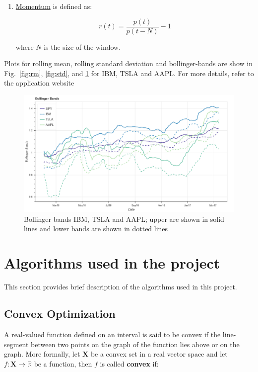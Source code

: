 \documentclass[12pt]{article}
\begin{document}
\begin{itemize}
\begin{enumerate}
\item \underline{Momentum} is defined as:

\begin{equation}
 \label{eq:mtm}
r(t)=\frac{p(t)}{p(t-N)}-1
\end{equation}

where $N$ is the size of the window.
\end{enumerate}

Plots for rolling mean, rolling standard deviation and bollinger-bands are show in  Fig.~\ref{fig:rm}, \ref{fig:std}, and \ref{fig:bb} for IBM, TSLA and AAPL. For more details, refer to the application website \cite{pp}

\begin{figure}[!htbp]
\begin{center}
\includegraphics[height=0.5\textheight,width=\textwidth]{rolling_bb.png}
\caption{Bollinger bands IBM, TSLA and AAPL; upper are shown in solid lines and lower bands are shown in dotted lines }
\label{fig:bb}
\end{center}
\end{figure}

\section{Algorithms used in the project}
\label{sec:algos}

This section provides brief description of the algorithms used in this project.

\subsection{Convex Optimization}
\label{sec:convex}
A real-valued function defined on an interval is said to be convex if the line-segment between two points on the graph of the function lies above or on the graph. More formally, let $\mathbf{X}$ be a convex set in a real vector space and let $f: \mathbf{X}\rightarrow \mathbb{R}$ be a function, then $f$ is called \textbf{convex} if:


\end{itemize}
\end{document}

